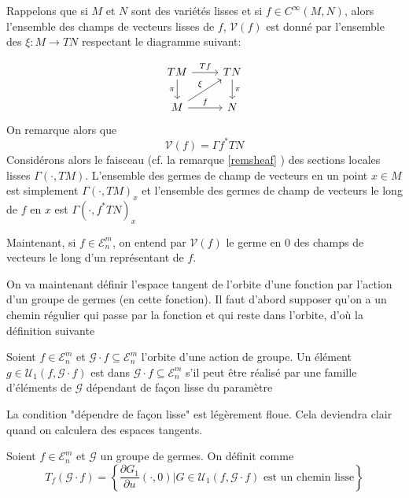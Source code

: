 \documentclass[memoire.tex]{subfiles}
\begin{document}
Rappelons que si $M$ et $N$ sont des variétés lisses et si $f\in C^{\infty}(M,N)$, alors l'ensemble des champs de vecteurs lisses  de $f$, $\mathcal{V}(f)$ est donné par l'ensemble des $\xi: M\rightarrow TN$
respectant le diagramme suivant: 

\[\begin{tikzcd}
	TM & TN \\
	M & N
	\arrow["Tf", from=1-1, to=1-2]
	\arrow["\pi"', from=1-1, to=2-1]
	\arrow["\pi", from=1-2, to=2-2]
	\arrow["\xi", from=2-1, to=1-2]
	\arrow["f", from=2-1, to=2-2]
\end{tikzcd}\]
On remarque alors que
\begin{equation*}
    \mathcal{V}(f)=\Gamma f^{*} TN
\end{equation*}
Considérons alors le faisceau (cf. la remarque \ref{remsheaf} )
des sections locales lisses 
$\Gamma(\cdot,TM)$. L'ensemble des germes de champ de vecteurs en un point $x\in M$ est simplement $\Gamma(\cdot,TM)_x$ et l'ensemble des germes de champ de vecteurs le long de $f$ en $x$ est $\Gamma(\cdot, f^{*}TN)_{x}$

Maintenant, si $f\in\mathcal{E}^m_n$, on 
entend par $\mathcal{V}(f)$ le germe en $0$ 
des champs de vecteurs le long d'un 
représentant de $f$.

On va maintenant définir l'espace tangent de 
l'orbite d'une fonction par l'action d'un 
groupe de germes (en cette fonction). Il faut 
d'abord supposer qu'on a un chemin régulier qui 
passe par la fonction et qui reste dans 
l'orbite, d'où la définition suivante

\begin{definition}
    Soient $f\in\mathcal{E}^m_n$ et $\mathcal{G}
    \cdot f\subseteq \mathcal{E}^m_n$ l'orbite 
    d'une action de groupe. Un élément $g\in\mathcal{U}_1(f,\mathcal{G}\cdot f)$ est  dans   $\mathcal{G}
    \cdot f\subseteq \mathcal{E}^m_n$ s'il peut être réalisé par une famille d'éléments de $\mathcal{G}$ dépendant de façon lisse du paramètre
\end{definition}
La condition "dépendre de façon lisse" est légèrement floue. Cela deviendra clair quand on calculera des espaces tangents.
\begin{definition}
    Soient $f\in \mathcal{E}^m_n$ et  $\mathcal{G}$ un groupe de germes. On définit 
    comme 
    \begin{equation*}
        T_f (\mathcal{G}\cdot f) =\left\{\frac{\partial G_1}{\partial u}(\cdot,0) \biggr| G\in\mathcal{U}_1(f,\mathcal{G}\cdot f)\text{ est un chemin lisse} \right\}
    \end{equation*}
\end{definition}
\end{document}
